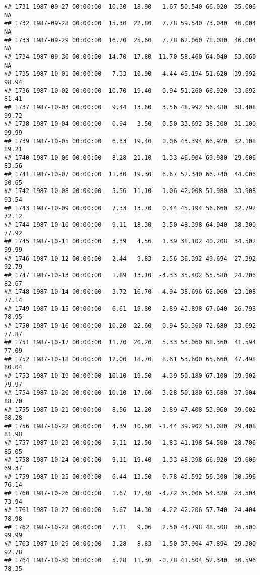 \documentclass{article}\usepackage{graphicx, color}
\makeatletter
\newenvironment{kframe}{%
 \def\at@end@of@kframe{}%
 \ifinner\ifhmode%
  \def\at@end@of@kframe{\end{minipage}}%
  \begin{minipage}{\columnwidth}%
 \fi\fi%
 \def\FrameCommand##1{\hskip\@totalleftmargin \hskip-\fboxsep
 \colorbox{shadecolor}{##1}\hskip-\fboxsep
     \hskip-\linewidth \hskip-\@totalleftmargin \hskip\columnwidth}%
 \MakeFramed {\advance\hsize-\width
   \@totalleftmargin\z@ \linewidth\hsize
   \@setminipage}}%
 {\par\unskip\endMakeFramed%
 \at@end@of@kframe}
\newenvironment{knitrout}{}{} %
\makeatother
\begin{document}
\begin{knitrout}
\begin{kframe}
\begin{verbatim}
## 1731 1987-09-27 00:00:00  10.30  18.90   1.67 50.540 66.020  35.006     NA
## 1732 1987-09-28 00:00:00  15.30  22.80   7.78 59.540 73.040  46.004     NA
## 1733 1987-09-29 00:00:00  16.70  25.60   7.78 62.060 78.080  46.004     NA
## 1734 1987-09-30 00:00:00  14.70  17.80  11.70 58.460 64.040  53.060     NA
## 1735 1987-10-01 00:00:00   7.33  10.90   4.44 45.194 51.620  39.992  98.94
## 1736 1987-10-02 00:00:00  10.70  19.40   0.94 51.260 66.920  33.692  81.41
## 1737 1987-10-03 00:00:00   9.44  13.60   3.56 48.992 56.480  38.408  99.72
## 1738 1987-10-04 00:00:00   0.94   3.50  -0.50 33.692 38.300  31.100  99.99
## 1739 1987-10-05 00:00:00   6.33  19.40   0.06 43.394 66.920  32.108  89.21
## 1740 1987-10-06 00:00:00   8.28  21.10  -1.33 46.904 69.980  29.606  83.56
## 1741 1987-10-07 00:00:00  11.30  19.30   6.67 52.340 66.740  44.006  90.65
## 1742 1987-10-08 00:00:00   5.56  11.10   1.06 42.008 51.980  33.908  93.54
## 1743 1987-10-09 00:00:00   7.33  13.70   0.44 45.194 56.660  32.792  72.12
## 1744 1987-10-10 00:00:00   9.11  18.30   3.50 48.398 64.940  38.300  77.92
## 1745 1987-10-11 00:00:00   3.39   4.56   1.39 38.102 40.208  34.502  99.99
## 1746 1987-10-12 00:00:00   2.44   9.83  -2.56 36.392 49.694  27.392  92.79
## 1747 1987-10-13 00:00:00   1.89  13.10  -4.33 35.402 55.580  24.206  82.67
## 1748 1987-10-14 00:00:00   3.72  16.70  -4.94 38.696 62.060  23.108  77.14
## 1749 1987-10-15 00:00:00   6.61  19.80  -2.89 43.898 67.640  26.798  78.95
## 1750 1987-10-16 00:00:00  10.20  22.60   0.94 50.360 72.680  33.692  77.87
## 1751 1987-10-17 00:00:00  11.70  20.20   5.33 53.060 68.360  41.594  77.09
## 1752 1987-10-18 00:00:00  12.00  18.70   8.61 53.600 65.660  47.498  80.04
## 1753 1987-10-19 00:00:00  10.10  19.50   4.39 50.180 67.100  39.902  79.97
## 1754 1987-10-20 00:00:00  10.10  17.60   3.28 50.180 63.680  37.904  88.70
## 1755 1987-10-21 00:00:00   8.56  12.20   3.89 47.408 53.960  39.002  98.28
## 1756 1987-10-22 00:00:00   4.39  10.60  -1.44 39.902 51.080  29.408  81.98
## 1757 1987-10-23 00:00:00   5.11  12.50  -1.83 41.198 54.500  28.706  85.05
## 1758 1987-10-24 00:00:00   9.11  19.40  -1.33 48.398 66.920  29.606  69.37
## 1759 1987-10-25 00:00:00   6.44  13.50  -0.78 43.592 56.300  30.596  76.14
## 1760 1987-10-26 00:00:00   1.67  12.40  -4.72 35.006 54.320  23.504  73.94
## 1761 1987-10-27 00:00:00   5.67  14.30  -4.22 42.206 57.740  24.404  78.98
## 1762 1987-10-28 00:00:00   7.11   9.06   2.50 44.798 48.308  36.500  99.99
## 1763 1987-10-29 00:00:00   3.28   8.83  -1.50 37.904 47.894  29.300  92.78
## 1764 1987-10-30 00:00:00   5.28  11.30  -0.78 41.504 52.340  30.596  78.35

\end{verbatim}
\end{kframe}
\end{knitrout}
\end{document}
